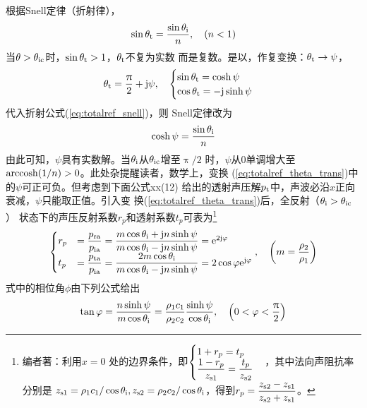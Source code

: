 \documentclass[UTF8]{ctexbook}
\begin{document}
根据Snell定律（折射律），
\begin{equation}
	\label{eq:totalref_snell}
	\sin\theta\st{t} = \frac{\sin\theta\st{i}}{n}\qc (n<1)
\end{equation}
当$\theta>\theta_\text{ic}$时，$\sin\theta_\text{t}>1$，$\theta_\text{t}$不复为实数
而是复数。是以，作复变换：$\theta_\text{t} \rightarrow \psi$，
\begin{equation}
	\label{eq:totalref_theta_trans}
	\theta\st{t} = \frac{\uppi}{2}+\mj \psi\qc 
	\begin{cases}
		\sin \theta\st{t} = \cosh \psi\\
		\cos\theta\st{t} = -\mj \sinh \psi
	\end{cases}
\end{equation}
代入折射公式(\ref{eq:totalref_snell})，则 Snell定律改为
\begin{equation}
	\cosh \psi = \frac{\sin \theta_\text{i}}{n}
\end{equation}
由此可知，$\psi$具有实数解。当$\theta_\text{i}$从$\theta_\text{ic}$增至$\uppi/2$
时，$\psi$从$0$单调增大至$\operatorname{arccosh}(1/n)>0$。此处杂提醒读者，数学上，变换
(\ref{eq:totalref_theta_trans})中的$\psi$可正可负。但考虑到下面公式xx(12)
给出的透射声压解$p_\text{t}$中，声波必沿$x$正向衰减，$\psi$只能取正值。引入变
换(\ref{eq:totalref_theta_trans})后，全反射（$\theta_\text{i}>\theta_\text{ic}$）
状态下的声压反射系数$r_p$和透射系数$t_p$可表为\footnote{编者著：利用$x=0$
处的边界条件，即$\begin{cases}1+r_p = t_p\\ \dfrac{1-r_p}{z_\text{s1}} =
	\dfrac{t_p}{z_\text{s2}}\end{cases}$，其中法向声阻抗率分别是
$z_\text{s1}= \rho_1c_1/\cos \theta_\text{i}, z_\text{s2} = \rho_2c_2
/\cos\theta_\text{i}$，得到$r_p = \dfrac{z_\text{s2}-z_\text{s1}}{z_\text{s2}+z_\text{s1}}
$。}
\begin{equation}
	\label{eq:totalref_rptp}
	\begin{cases}
		r_p & = \dfrac{p\st{ra}}{p\st{ia}} = \dfrac{m\cos \theta \st{i} +
	\mj n \sinh \psi }{m\cos \theta\st{i} - \mj n \sinh \psi} = 
	\me^{2\mj \phi}\\
	t_p&=\dfrac{p\st{ta}}{p\st{ia}} = \dfrac{2m\cos \theta \st{i}}{m\cos 
		\theta\st{i} - \mj n \sinh \psi} = 2\cos\phi \me^{\mj \phi}
	\end{cases}
	\qc \qty(m = \frac{\rho_2}{\rho_1})
\end{equation}
式中的相位角$\phi$由下列公式给出
\begin{equation}
	\tan \phi = \frac{n\sinh \psi}{m \cos \theta\st{i}} = 
	\frac{\rho_1c_1}{\rho_2c_2} \frac{\sinh \psi}{\cos \theta\st{i}}
	\qc \qty(0<\phi<\frac{\uppi}{2})
\end{equation}
\end{document}
